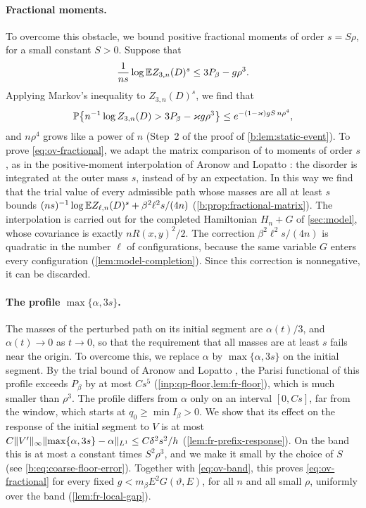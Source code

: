 \paragraph{Fractional moments.} To overcome this obstacle, we bound positive
fractional moments of order $s=S\rho$, for a small constant $S>0$. Suppose that
\begin{equation}\label{eq:ov-fractional}
 \frac1{ns}\log\mathbb E Z_{3,n}(D)^s\le3P_\beta-g\rho^3 .
\end{equation}
Applying Markov's inequality to $Z_{3,n}(D)^s$, we find that
\[
 \mathbb P\bigl\{n^{-1}\log Z_{3,n}(D)>3P_\beta-\varkappa g\rho^3\bigr\}
 \le e^{-(1-\varkappa)gS\,n\rho^4},
\]
and $n\rho^4$ grows like a power of $n$ (Step~2 of the proof of
\cref{b:lem:static-event}). To prove \eqref{eq:ov-fractional}, we adapt the
matrix comparison of \cite[Proposition~2.3]{oai-barriers} to moments of order
$s$, as in the positive-moment interpolation of Aronow and Lopatto
\cite[Section~2.3]{quantitative-parisi}: the disorder is integrated at the outer
mass $s$, instead of by an expectation. In this way we find that the trial
value of every admissible path whose masses are all at least $s$ bounds
$(ns)^{-1}\log\mathbb E Z_{\ell,n}(D)^s+\beta^2\ell^2s/(4n)$
(\cref{b:prop:fractional-matrix}). The interpolation is carried out for the
completed Hamiltonian $H_n+G$ of \cref{sec:model}, whose covariance is exactly
$nR(x,y)^2/2$. The correction $\beta^2\ell^2s/(4n)$ is quadratic in the number
$\ell$ of configurations, because the same variable $G$ enters every
configuration (\cref{lem:model-completion}). Since this correction is
nonnegative, it can be discarded.

\paragraph{The profile $\max\{\alpha,3s\}$.} The masses of the perturbed path
on its initial segment are $\alpha(t)/3$, and $\alpha(t)\to0$ as $t\to0$, so
that the requirement that all masses are at least $s$ fails near the origin.
To overcome this, we replace $\alpha$ by $\max\{\alpha,3s\}$ on the initial
segment. By the trial bound of Aronow and Lopatto
\cite[Lemma~7.2]{quantitative-parisi}, the Parisi functional of this profile
exceeds $P_\beta$ by at most $Cs^5$ (\cref{inp:qp-floor,lem:fr-floor}), which
is much smaller than $\rho^3$. The profile differs from $\alpha$ only on an
interval $[0,Cs]$, far from the window, which starts at $q_0\ge\min I_\beta>0$. We
show that its effect on the response of the initial segment to $V$ is at most
$C\lVert V'\rVert_\infty\lVert \max\{\alpha,3s\}-\alpha\rVert_{L^1}\le C\delta^2s^2/h$
(\cref{lem:fr-prefix-response}). On the band this is at most a constant times
$S^2\rho^3$, and we make it small by the choice of $S$
(see \eqref{b:eq:coarse-floor-error}). Together with \eqref{eq:ov-band}, this
proves \eqref{eq:ov-fractional} for every fixed $g<m_\beta E^2G(\vartheta,E)$,
for all $n$ and all small $\rho$, uniformly over the band
(\cref{lem:fr-local-gap}).

